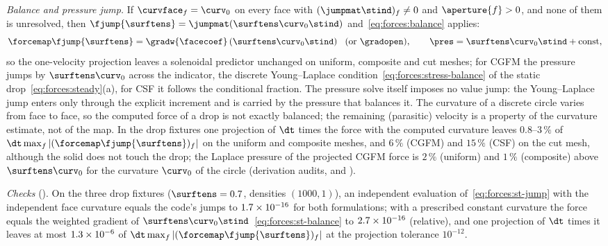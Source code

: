 

\emph{Balance and pressure jump.} If $\curvface_f=\curv_0$ on every face
with $(\jumpmat\stind)_f\neq0$ and $\aperture{f}>0$, and none of them is
unresolved, then $\fjump{\surftens}=\jumpmat(\surftens\curv_0\stind)$
and~\cref{eq:forces:balance} applies:
\begin{equation}\label{eq:forces:st-balance}
  \forcemap\fjump{\surftens}=\gradw{\facecoef}\roundpar{\surftens\curv_0\stind}
  \ \ (\text{or }\gradopen),\qquad
  \pres=\surftens\curv_0\stind+\text{const},
\end{equation}
so the one-velocity projection leaves a solenoidal predictor unchanged on
uniform, composite and cut meshes; for CGFM the pressure jumps by
$\surftens\curv_0$ across the indicator, the discrete Young--Laplace
condition~\cref{eq:forces:stress-balance} of the static drop~\cref{eq:forces:steady}(a),
for CSF it follows the conditional fraction. The pressure solve itself
imposes no value jump: the Young--Laplace jump enters only through the
explicit increment and is carried by the pressure that balances it. The
curvature of a discrete circle varies from face to face, so the computed
force of a drop is not exactly balanced; the remaining (parasitic) velocity
is a property of the curvature estimate, not of the map. In the drop
fixtures one projection of $\dt$ times the force with the computed
curvature leaves $0.8$--$3\,\%$ of $\dt\max_f\abs{(\forcemap\fjump{\surftens})_f}$
on the uniform and composite meshes, and $6\,\%$ (CGFM) and $15\,\%$ (CSF)
on the cut mesh, although the solid does not touch the drop; the Laplace
pressure of the projected CGFM force is $2\,\%$ (uniform) and $1\,\%$
(composite) above $\surftens\curv_0$ for the curvature $\curv_0$ of the
circle (derivation audits,  and
).

\emph{Checks} (). On the three drop fixtures
($\surftens=0.7$, densities $(1000,1)$), an independent evaluation
of~\cref{eq:forces:st-jump} with the independent face curvature
equals the code's jumps to $1.7\times10^{-16}$ for both formulations; with
a prescribed constant curvature the force equals the weighted gradient of
$\surftens\curv_0\stind$~\cref{eq:forces:st-balance} to $2.7\times10^{-16}$
(relative), and one projection of $\dt$ times it leaves at most
$1.3\times10^{-6}$ of $\dt\max_f\abs{(\forcemap\fjump{\surftens})_f}$ at the
projection tolerance $10^{-12}$.


